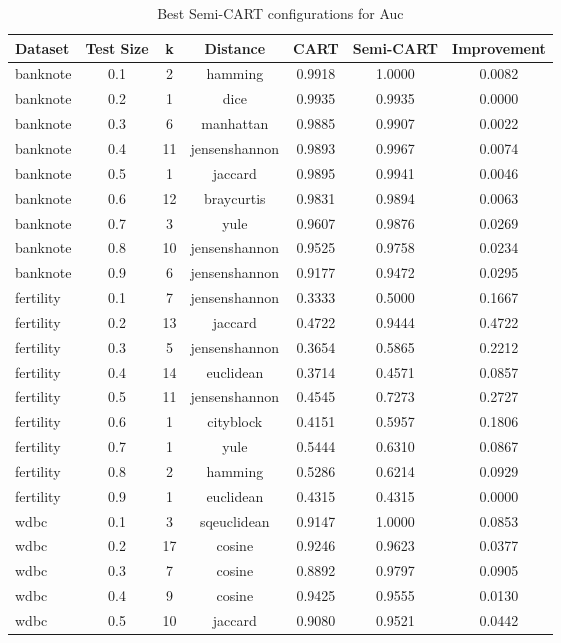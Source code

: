 \begin{table}[ht]
\centering
\caption{Best Semi-CART configurations for Auc}
\begin{tabular}{lcccccc}
\hline
Dataset & Test Size & k & Distance & CART & Semi-CART & Improvement \\ \hline
banknote & 0.1 & 2 & hamming & 0.9918 & 1.0000 & 0.0082 \\
banknote & 0.2 & 1 & dice & 0.9935 & 0.9935 & 0.0000 \\
banknote & 0.3 & 6 & manhattan & 0.9885 & 0.9907 & 0.0022 \\
banknote & 0.4 & 11 & jensenshannon & 0.9893 & 0.9967 & 0.0074 \\
banknote & 0.5 & 1 & jaccard & 0.9895 & 0.9941 & 0.0046 \\
banknote & 0.6 & 12 & braycurtis & 0.9831 & 0.9894 & 0.0063 \\
banknote & 0.7 & 3 & yule & 0.9607 & 0.9876 & 0.0269 \\
banknote & 0.8 & 10 & jensenshannon & 0.9525 & 0.9758 & 0.0234 \\
banknote & 0.9 & 6 & jensenshannon & 0.9177 & 0.9472 & 0.0295 \\
fertility & 0.1 & 7 & jensenshannon & 0.3333 & 0.5000 & 0.1667 \\
fertility & 0.2 & 13 & jaccard & 0.4722 & 0.9444 & 0.4722 \\
fertility & 0.3 & 5 & jensenshannon & 0.3654 & 0.5865 & 0.2212 \\
fertility & 0.4 & 14 & euclidean & 0.3714 & 0.4571 & 0.0857 \\
fertility & 0.5 & 11 & jensenshannon & 0.4545 & 0.7273 & 0.2727 \\
fertility & 0.6 & 1 & cityblock & 0.4151 & 0.5957 & 0.1806 \\
fertility & 0.7 & 1 & yule & 0.5444 & 0.6310 & 0.0867 \\
fertility & 0.8 & 2 & hamming & 0.5286 & 0.6214 & 0.0929 \\
fertility & 0.9 & 1 & euclidean & 0.4315 & 0.4315 & 0.0000 \\
wdbc & 0.1 & 3 & sqeuclidean & 0.9147 & 1.0000 & 0.0853 \\
wdbc & 0.2 & 17 & cosine & 0.9246 & 0.9623 & 0.0377 \\
wdbc & 0.3 & 7 & cosine & 0.8892 & 0.9797 & 0.0905 \\
wdbc & 0.4 & 9 & cosine & 0.9425 & 0.9555 & 0.0130 \\
wdbc & 0.5 & 10 & jaccard & 0.9080 & 0.9521 & 0.0442 \\

\end{tabular}
\end{table}
